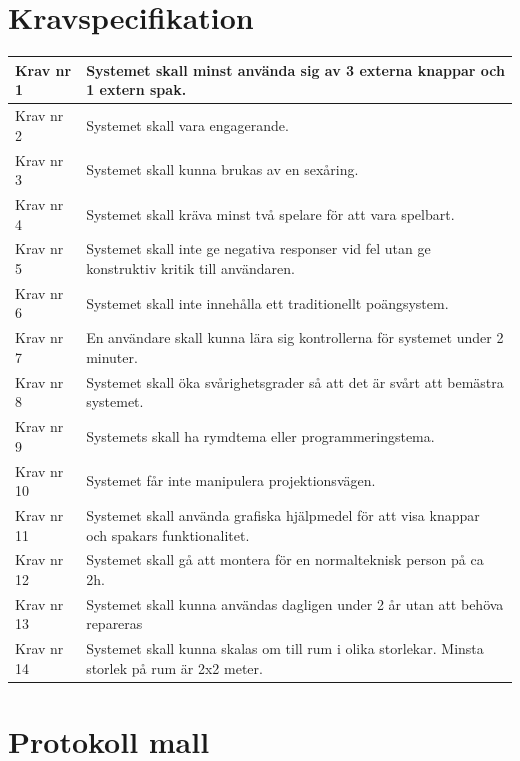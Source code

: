 \documentclass[a4paper,12pt,oneside,final]{extbook}
\begin{document}
\chapter{Kravspecifikation}\label{Kravspecifikation}
\begin{center}
	\begin{tabular}{ | m{5em} | m{30em}| } 
		\hline
		Krav nr 1& Systemet skall minst använda sig av 3 externa knappar och 1 extern spak.   \\ 
		\hline
		Krav nr 2 & Systemet skall vara engagerande.  \\ 
		\hline
		Krav nr 3 & Systemet skall kunna brukas av en sexåring. \\ 
		\hline
		Krav nr 4& Systemet skall kräva minst två spelare för att vara spelbart. \\ 
		\hline
		Krav nr 5 & Systemet skall inte ge negativa responser vid fel utan ge konstruktiv kritik till användaren. \\ 
		\hline
		Krav nr 6 & Systemet skall inte innehålla ett traditionellt poängsystem. \\ 
		\hline
		Krav nr 7& En användare skall kunna lära sig kontrollerna för systemet under 2 minuter. \\ 
		\hline
		Krav nr 8 & Systemet skall öka svårighetsgrader så att det är svårt att bemästra systemet. \\ 
		\hline
		Krav nr 9 & Systemets skall ha rymdtema eller programmeringstema. \\ 
		\hline
		Krav nr 10& Systemet får inte manipulera projektionsvägen. \\ 
		\hline
		Krav nr 11& Systemet skall använda grafiska hjälpmedel för att visa knappar och spakars funktionalitet.  \\ 
		\hline
		Krav nr 12& Systemet skall gå att montera för en normalteknisk person på ca 2h. \\ 
		\hline
		Krav nr 13& Systemet skall kunna användas dagligen under 2 år utan att behöva repareras \\ 
		\hline
		Krav nr 14 & Systemet skall kunna skalas om till rum i olika storlekar. Minsta storlek på rum är 2x2 meter. \\ 
		\hline
	\end{tabular}
\end{center}


\chapter{Protokoll mall}\label{protokoll}
\end{document}
